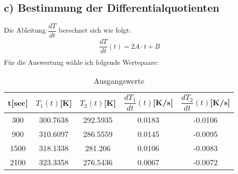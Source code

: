 \subsection{c) Bestimmung der Differentialquotienten}
Die Ableitung $\dfrac{dT}{dt}$ berechnet sich wie folgt:
\begin{align*}
  & \dfrac{dT}{dt}(t) = 2A \cdot t+B\\
\end{align*}
Für die Auswertung wähle ich folgende Wertepaare:
\begin{table}[H]
  \centering
  \caption{Ausgangswerte}
  \label{tab:data}
  \begin{tabular}{c c c c c}
    \toprule
    t[sec] & $T_1(t)$[K] & $T_2(t)$[K] & $\dfrac{dT_1}{dt}(t)$[K/s] & $\dfrac{dT_2}{dt}(t)$[K/s]\\
    \midrule
      300 & 300.7638 & 292.5935 & 0.0183 & -0.0106\\
      900 & 310.6097 & 286.5559 & 0.0145 & -0.0095\\
      1500 & 318.1338 & 281.206 & 0.0106 & -0.0083\\
      2100 & 323.3358 & 276.5436 & 0.0067 & -0.0072\\
    \bottomrule
  \end{tabular}
\end{table}





